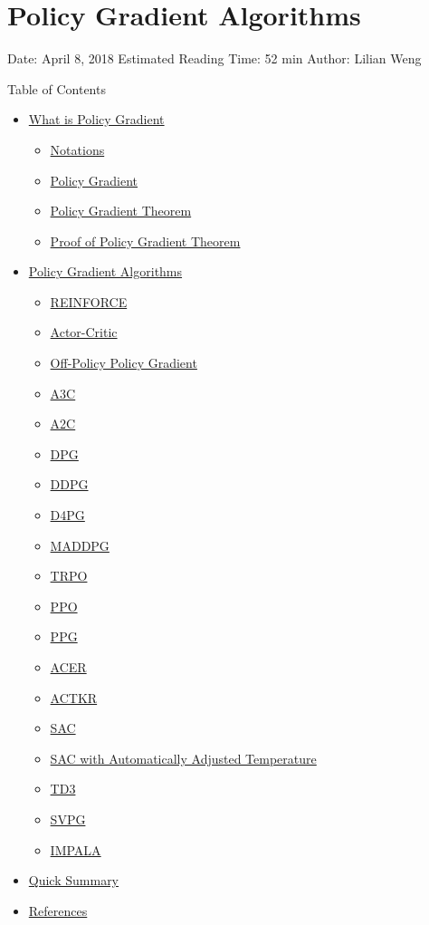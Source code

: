 \section{Policy Gradient Algorithms}\label{policy-gradient-algorithms}

Date: April 8, 2018 \textbar{} Estimated Reading Time: 52 min \textbar{} Author: Lilian Weng

{Table of Contents}

\begin{itemize}
\tightlist
\item
  \hyperref[what-is-policy-gradient]{What is Policy Gradient}

  \begin{itemize}
  \tightlist
  \item
    \hyperref[notations]{Notations}
  \item
    \hyperref[policy-gradient]{Policy Gradient}
  \item
    \hyperref[policy-gradient-theorem]{Policy Gradient Theorem}
  \item
    \hyperref[proof-of-policy-gradient-theorem]{Proof of Policy Gradient Theorem}
  \end{itemize}
\item
  \hyperref[policy-gradient-algorithms]{Policy Gradient Algorithms}

  \begin{itemize}
  \tightlist
  \item
    \hyperref[reinforce]{REINFORCE}
  \item
    \hyperref[actor-critic]{Actor-Critic}
  \item
    \hyperref[off-policy-policy-gradient]{Off-Policy Policy Gradient}
  \item
    \hyperref[a3c]{A3C}
  \item
    \hyperref[a2c]{A2C}
  \item
    \hyperref[dpg]{DPG}
  \item
    \hyperref[ddpg]{DDPG}
  \item
    \hyperref[d4pg]{D4PG}
  \item
    \hyperref[maddpg]{MADDPG}
  \item
    \hyperref[trpo]{TRPO}
  \item
    \hyperref[ppo]{PPO}
  \item
    \hyperref[ppg]{PPG}
  \item
    \hyperref[acer]{ACER}
  \item
    \hyperref[actkr]{ACTKR}
  \item
    \hyperref[sac]{SAC}
  \item
    \hyperref[sac-with-automatically-adjusted-temperature]{SAC with Automatically Adjusted Temperature}
  \item
    \hyperref[td3]{TD3}
  \item
    \hyperref[svpg]{SVPG}
  \item
    \hyperref[impala]{IMPALA}
  \end{itemize}
\item
  \hyperref[quick-summary]{Quick Summary}
\item
  \hyperref[references]{References}
\end{itemize}

